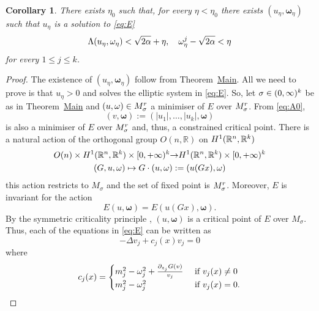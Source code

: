 \documentclass[a4paper,12pt,oneside]{amsart}
\newtheorem*{cor*}{Corollary}
\theoremstyle{definition}
\theoremstyle{remark}
\theoremstyle{theorem}
\begin{document}
\begin{cor*}
There exists $ \eta_0 $ such that, for every $ \eta < \eta_0 $ there
exists $ (u_\eta,{\mathbf{\omega}}_\eta) $ such that $ u_\eta $ is a solution to 
\eqref{eq:E}
\begin{gather*}
\Lambda(u_\eta,{\mathbf{\omega}}_\eta) < \sqrt{2\alpha} + \eta,\quad
{\mathbf{\omega}}_\eta \sp j - \sqrt{2\alpha} < \eta
\end{gather*}
for every $ 1\leq j\leq k $.
\end{cor*}
\begin{proof}
The existence of $ (u_\eta,{\mathbf{\omega}}_\eta) $ follow from Theorem~\hyperlink{thm:main}{Main}. All we need to prove is that $ u_\eta > 0 $ and solves the
elliptic system in \eqref{eq:E}.
So, let $ {\sigma}\in (0,\infty)\sp k $ be as in 
Theorem~\hyperlink{thm:main}{Main} and $ (u,{\mathbf{\omega}})\in M_{\sigma}\sp r  $ a
minimiser of $ E $ over $ M_{\sigma}\sp r  $. From \eqref{eq:A0}, 
\[
(v,{\mathbf{\omega}}) := (|u_1|,\dots,|u_k|,{\mathbf{\omega}})
\]
is also a minimiser of $ E $ over $ M_{\sigma}\sp r $ and, thus, a constrained 
critical point. 
There is a natural action
of the orthogonal group $ O({n},{\mathbb{R}}) $ on $ H\sp 1 ({{\mathbb{R}}\sp{n}},{\mathbb{R}}\sp k) $
\begin{gather*}
O({n})\times H\sp 1 ({\mathbb{R}}\sp{n},{\mathbb{R}}\sp k)\times [0,+\infty)\sp k 
{\rightarrow} H\sp 1 ({\mathbb{R}}\sp{n},{\mathbb{R}}\sp k)\times [0,+\infty)\sp k\\
(G,u,{\mathbf{\omega}})\mapsto G\cdot (u,{\mathbf{\omega}}) := (u(Gx),{\mathbf{\omega}})
\end{gather*}
this action restricts to $ M_{\sigma} $ and the set of fixed point is
$ M_{\sigma}\sp r  $. Moreover, $ E $ is invariant for the action
\[
E(u,{\mathbf{\omega}}) = E(u(Gx),{\mathbf{\omega}}).
\]
By the symmetric criticality principle \cite[\S 0]{Pal79}, $ (u,{\mathbf{\omega}}) $
is a critical point of $ E $ over $ M_{\sigma} $. Thus, each 
of the equations in \eqref{eq:E} can be written as
\begin{equation}
\label{eq:E-2}
-\Delta v_j + c_j (x) v_j = 0
\end{equation}
where
\begin{equation}
\label{eq:maxp}
c_j (x) = 
\begin{cases}
m_j\sp 2 - {\mathbf{\omega}}_j\sp 2 + \frac{{\partial}_{z_j} {G}(v)}{v_j} 
&\text{ if } v_j (x)\neq 0\\
m_j\sp 2 - {\mathbf{\omega}}_j\sp 2 &\text{ if } v_j (x) = 0.
\end{cases}

\end{equation}
\end{proof}
\end{document}
